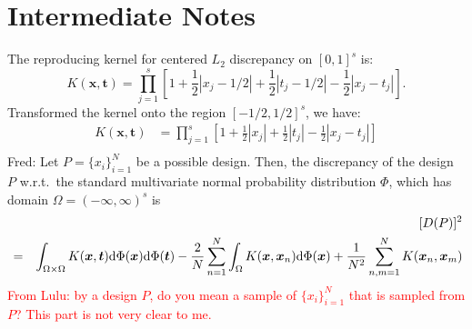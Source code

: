 \documentclass[12pt]{article}
\newcommand{\vx}{\boldsymbol{x}}
\newcommand{\vt}{\boldsymbol{t}}
\newcommand{\dif}{{\rm d}}
\newcommand{\FJH}[1]{{\color{blue}Fred: #1}}
\begin{document}
\section{Intermediate Notes}
The reproducing kernel for centered $L_2$ discrepancy on $[0,1]^s$ is:
$$K(\vx,\vt) = \prod\limits_{j=1}^s\left[1+\frac{1}{2}|x_j-1/2|+\frac{1}{2}|t_j-1/2|-\frac{1}{2}|x_j-t_j|\right].$$
Transformed the kernel onto the region $[-1/2,1/2]^s$, we have:
\begin{align*}
    K(\vx,\vt) & = \prod\limits_{j=1}^s\left[1+\frac{1}{2}|x_j|+\frac{1}{2}|t_j|-\frac{1}{2}|x_j-t_j|\right] \\
\end{align*}
\FJH{Let $P = \{x_i\}_{i=1}^N$ be a possible design.}  Then, the discrepancy of the design $P$ w.r.t.\ the standard multivariate normal probability distribution $\Phi$, which has domain $\Omega = (-\infty,\infty)^s$ is
\begin{eqnarray*}
&&[D(P)]^2\\
&=& \int_{\Omega\times \Omega} K(\vx,\vt)\dif \Phi(\vx)\dif \Phi(\vt)-\frac{2}{N}\sum_{n=1}^N \int_{\Omega}K(\vx,\vx_n)\dif \Phi(\vx)+\frac{1}{N^2}\sum_{n,m=1}^N K(\vx_n,\vx_m)\\
\end{eqnarray*}
\textcolor{red}{From Lulu: by a design $P$, do you mean a sample of $\{x_i\}_{i=1}^N$ that is sampled from $P$? This part is not very clear to me.}
\end{document}
